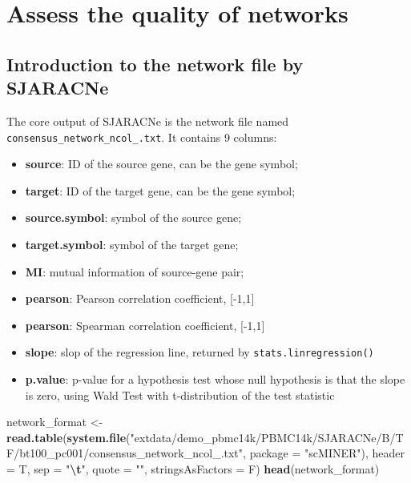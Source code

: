 \documentclass[
  12pt,
]{book}
\newenvironment{Shaded}{\begin{snugshade}}{\end{snugshade}}
\newcommand{\AttributeTok}[1]{\textcolor[rgb]{0.13,0.29,0.53}{#1}}
\newcommand{\FunctionTok}[1]{\textcolor[rgb]{0.13,0.29,0.53}{\textbf{#1}}}
\newcommand{\NormalTok}[1]{#1}
\newcommand{\OtherTok}[1]{\textcolor[rgb]{0.56,0.35,0.01}{#1}}
\newcommand{\SpecialCharTok}[1]{\textcolor[rgb]{0.81,0.36,0.00}{\textbf{#1}}}
\newcommand{\StringTok}[1]{\textcolor[rgb]{0.31,0.60,0.02}{#1}}
\providecommand{\tightlist}{%
  \setlength{\itemsep}{0pt}\setlength{\parskip}{0pt}}
\begin{document}
\section{Assess the quality of networks}\label{assess-the-quality-of-networks}

\subsection{Introduction to the network file by SJARACNe}\label{introduction-to-the-network-file-by-sjaracne}

The core output of SJARACNe is the network file named \texttt{consensus\_network\_ncol\_.txt}. It contains 9 columns:

\begin{itemize}
\tightlist
\item
  \textbf{source}: ID of the source gene, can be the gene symbol;
\item
  \textbf{target}: ID of the target gene, can be the gene symbol;
\item
  \textbf{source.symbol}: symbol of the source gene;
\item
  \textbf{target.symbol}: symbol of the target gene;
\item
  \textbf{MI}: mutual information of source-gene pair;
\item
  \textbf{pearson}: Pearson correlation coefficient, {[}-1,1{]}
\item
  \textbf{pearson}: Spearman correlation coefficient, {[}-1,1{]}
\item
  \textbf{slope}: slop of the regression line, returned by \texttt{stats.linregression()}
\item
  \textbf{p.value}: p-value for a hypothesis test whose null hypothesis is that the slope is zero, using Wald Test with t-distribution of the test statistic
\end{itemize}

\begin{Shaded}
\begin{Highlighting}[]
\NormalTok{network\_format }\OtherTok{\textless{}{-}} \FunctionTok{read.table}\NormalTok{(}\FunctionTok{system.file}\NormalTok{(}\StringTok{"extdata/demo\_pbmc14k/PBMC14k/SJARACNe/B/TF/bt100\_pc001/consensus\_network\_ncol\_.txt"}\NormalTok{, }\AttributeTok{package =} \StringTok{"scMINER"}\NormalTok{),}
                             \AttributeTok{header =}\NormalTok{ T, }\AttributeTok{sep =} \StringTok{"}\SpecialCharTok{\textbackslash{}t}\StringTok{"}\NormalTok{, }\AttributeTok{quote =} \StringTok{""}\NormalTok{, }\AttributeTok{stringsAsFactors =}\NormalTok{ F)}
\FunctionTok{head}\NormalTok{(network\_format)}
\end{Highlighting}
\end{Shaded}
\end{document}
